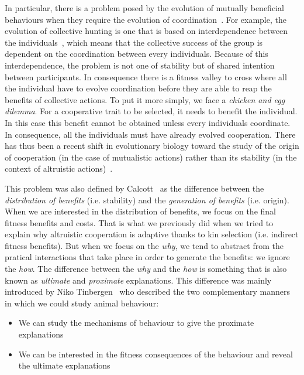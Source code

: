     In particular, there is a problem posed by the evolution of mutually beneficial behaviours when they require the evolution of coordination~\parencite{Alvard2001, Alvard2003, Drea2009, Leimar2003}. For example, the evolution of collective hunting is one that is based on interdependence between the individuals~\parencite{Tomasello2012}, which means that the collective success of the group is dependent on the coordination between every individuals. Because of this interdependence, the problem is not one of stability but of shared intention between participants. In consequence there is a fitness valley to cross where all the individual have to evolve coordination before they are able to reap the benefits of collective actions. To put it more simply, we face a \emph{chicken and egg dilemma}. For a cooperative trait to be selected, it needs to benefit the individual. In this case this benefit cannot be obtained unless every individuals coordinate. In consequence, all the individuals must have already evolved cooperation. There has thus been a recent shift in evolutionary biology toward the study of the origin of cooperation (in the case of mutualistic actions) rather than its stability (in the context of altruistic actions)~\parencite{Forber2015}.

    This problem was also defined by Calcott~\parencite{Calcott2007a} as the difference between the \emph{distribution of benefits} (i.e. stability) and the \emph{generation of benefits} (i.e. origin). When we are interested in the distribution of benefits, we focus on the final fitness benefits and costs. That is what we previously did when we tried to explain why altruistic cooperation is adaptive thanks to kin selection (i.e. indirect fitness benefits). But when we focus on the \emph{why}, we tend to abstract from the pratical interactions that take place in order to generate the benefits: we ignore the \emph{how}. The difference between the \emph{why} and the \emph{how} is something that is also known as \emph{ultimate} and \emph{proximate} explanations. This difference was mainly introduced by Niko Tinbergen~\parencite{Tinbergen1963, West2007a} who described the two complementary manners in which we could study animal behaviour:

    \begin{itemize}
      \item {We can study the mechanisms of behaviour to give the proximate explanations}
      \item {We can be interested in the fitness consequences of the behaviour and reveal the ultimate explanations}
    \end{itemize}

